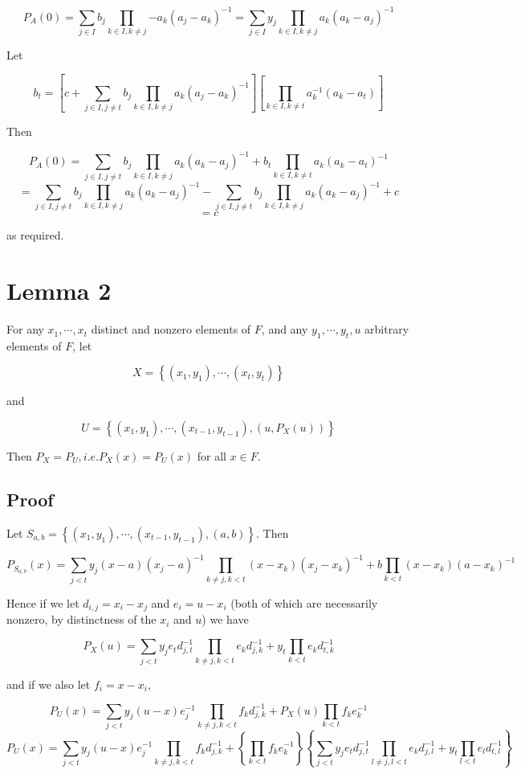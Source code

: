 \documentclass[]{article}
\begin{document}
\[
P_A(0) = \sum_{j\in I} {b_j \prod_{k\in I, k\neq j}{-a_k(a_j-a_k)^{-1}}}
= \sum_{j\in I} {y_j \prod_{k\in I, k\neq j}{a_k(a_k-a_j)^{-1}}}
\]

Let

\[
b_t = \left[c + \sum_{j\in I, j\neq t}{b_j\prod_{k\in I,k\neq j}{a_k(a_j-a_k)^{-1}}}\right]
        \left[\prod_{k\in I,k\neq t}{a_k^{-1}(a_k-a_t)}\right]
\]

Then

\[
P_A(0) = \sum_{j\in I, j\neq t} {b_j \prod_{k\in I, k\neq j}{a_k(a_k-a_j)^{-1}}} + b_t \prod_{k\in I, k\neq t}{a_k(a_k-a_t)^{-1}}
\]\[
= \sum_{j\in I, j\neq t} {b_j \prod_{k\in I, k\neq j}{a_k(a_k-a_j)^{-1}}} - \sum_{j\in I, j\neq t} {b_j \prod_{k\in I, k\neq j}{a_k(a_k-a_j)^{-1}}} + c
\]\[
= c
\]

as required.

\section{Lemma 2}

For any $x_1,\cdots,x_t$ distinct and nonzero elements of $F$, and any
$y_1,\cdots,y_t,u$ arbitrary elements of $F$, let

\[X = \left\{(x_1,y_1),\cdots,(x_t,y_t)\right\}\]

and

\[U = \left\{(x_1,y_1),\cdots,(x_{t-1},y_{t-1}),(u,P_X(u))\right\}\]

Then $P_X = P_U, i.e. P_X(x) = P_U(x)$ for all $x\in F$.

\subsection{Proof}

Let $S_{a,b} = \left\{(x_1,y_1),\cdots,(x_{t-1},y_{t-1}),(a,b)\right\}$.
Then

\[
P_{S_{a,b}}(x) = \sum_{j<t} y_j (x-a)(x_j-a)^{-1}
        \prod_{k\ne j,k<t}(x-x_k)(x_j-x_k)^{-1}
        + b\prod_{k<t}(x-x_k)(a-x_k)^{-1}
\]

Hence if we let $d_{i,j} = x_i - x_j$ and $e_i = u - x_i$ (both of which
are necessarily nonzero, by distinctness of the $x_i$ and $u$) we have

\[
P_X(u) = \sum_{j<t} y_j e_t d_{j,t}^{-1}
        \prod_{k\ne j,k<t}e_kd_{j,k}^{-1}
        + y_t\prod_{k<t}e_kd_{t,k}^{-1}
\]

and if we also let $f_i = x - x_i$,

\[
P_U(x) = \sum_{j<t} y_j (u-x)e_j^{-1} \prod_{k\ne j,k<t}f_k d_{j,k}^{-1}
    + P_X(u)\prod_{k<t} f_k e_k^{-1}
\]\[
P_U(x) = \sum_{j<t} y_j (u-x)e_j^{-1} \prod_{k\ne j,k<t}f_k d_{j,k}^{-1}
    + \left\{\prod_{k<t} f_k e_k^{-1}\right\}\left\{
        \sum_{j<t} y_j e_t d_{j,t}^{-1}\prod_{l\ne j,l<t}e_kd_{j,l}^{-1}
        + y_t\prod_{l<t}e_ld_{t,l}^{-1}
    \right\}
\]
\end{document}
